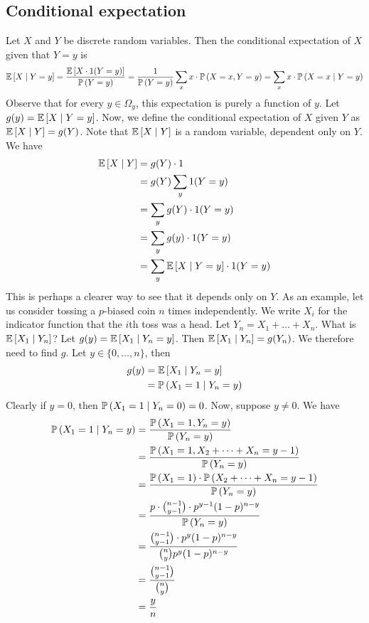 \subsection{Conditional expectation}
Let \(X\) and \(Y\) be discrete random variables.
Then the conditional expectation of \(X\) given that \(Y = y\) is
\[
	\mathbb{E}\left[{X \mid Y = y}\right] = \frac{\mathbb{E}\left[{X \cdot 1(Y = y)}\right]}{\mathbb{P}\left({Y = y}\right)} = \frac{1}{\mathbb{P}\left({Y = y}\right)} \sum_x x \cdot \mathbb{P}\left({X = x, Y = y}\right) = \sum_x x \cdot \mathbb{P}\left({X = x \mid Y = y}\right)
\]
Observe that for every \(y \in \Omega_y\), this expectation is purely a function of \(y\).
Let \(g(y) = \mathbb{E}\left[{X \mid Y = y}\right]\).
Now, we define the conditional expectation of \(X\) given \(Y\) as \(\mathbb{E}\left[{X \mid Y}\right] = g(Y)\).
Note that \(\mathbb{E}\left[{X \mid Y}\right]\) is a random variable, dependent only on \(Y\).
We have
\begin{align*}
	\mathbb{E}\left[{X \mid Y}\right] & = g(Y) \cdot 1                                \\
	                  & = g(Y) \sum_y 1(Y = y)                        \\
	                  & = \sum_y g(Y) \cdot 1(Y = y)                  \\
	                  & = \sum_y g(y) \cdot 1(Y = y)                  \\
	                  & = \sum_y \mathbb{E}\left[{X \mid Y = y}\right] \cdot 1(Y = y)
\end{align*}
This is perhaps a clearer way to see that it depends only on \(Y\).
As an example, let us consider tossing a \(p\)-biased coin \(n\) times independently.
We write \(X_i\) for the indicator function that the \(i\)th toss was a head.
Let \(Y_n = X_1 + \dots + X_n\).
What is \(\mathbb{E}\left[{X_1 \mid Y_n}\right]\)?
Let \(g(y) = \mathbb{E}\left[{X_1 \mid Y_n = y}\right]\).
Then \(\mathbb{E}\left[{X_1 \mid Y_n}\right] = g(Y_n)\).
We therefore need to find \(g\).
Let \(y \in \{ 0, \dots, n \}\), then
\begin{align*}
	g(y) & = \mathbb{E}\left[{X_1 \mid Y_n = y}\right]   \\
	     & = \mathbb{P}\left({X_1 = 1 \mid Y_n = y}\right) \\
\end{align*}
Clearly if \(y = 0\), then \(\mathbb{P}\left({X_1 = 1 \mid Y_n = 0}\right) = 0\).
Now, suppose \(y \neq 0\).
We have
\begin{align*}
	\mathbb{P}\left({X_1 = 1 \mid Y_n = y}\right) & = \frac{\mathbb{P}\left({X_1 = 1, Y_n = y}\right)}{\mathbb{P}\left({Y_n = y}\right)}                             \\
	                            & = \frac{\mathbb{P}\left({X_1 = 1, X_2 + \dots + X_n = y-1}\right)}{\mathbb{P}\left({Y_n = y}\right)}             \\
	                            & = \frac{\mathbb{P}\left({X_1 = 1}\right) \cdot \mathbb{P}\left({X_2 + \dots + X_n = y-1}\right)}{\mathbb{P}\left({Y_n = y}\right)} \\
	                            & = \frac{p \cdot \binom{n-1}{y-1} \cdot p^{y-1}(1-p)^{n-y}}{\mathbb{P}\left({Y_n = y}\right)}   \\
	                            & = \frac{\binom{n-1}{y-1} \cdot p^y(1-p)^{n-y}}{\binom{n}{y}p^y (1-p)^{n-y}}  \\
	                            & = \frac{\binom{n-1}{y-1}}{\binom{n}{y}}                                      \\
	                            & = \frac{y}{n}
\end{align*}

